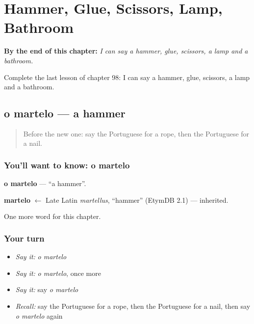 
\chapter{Hammer, Glue, Scissors, Lamp, Bathroom}
\label{ch:pt-hammer-glue-scissors-lamp-bathroom}

\begin{chapteropening}
\textbf{By the end of this chapter:} \emph{I can say a hammer, glue, scissors, a lamp and a bathroom.}

Complete the last lesson of chapter 98: I can say a hammer, glue, scissors, a lamp and a bathroom.
\end{chapteropening}

\section[o martelo]{o martelo — a hammer}

\label{lesson:PT-C98-martelo}



\begin{quote}
Before the new one: say the Portuguese for a rope, then the Portuguese for a nail.
\end{quote}

\subsection*{You'll want to know: o martelo}
\textbf{o martelo} — \textquotedblleft{}a hammer\textquotedblright{}.

\begin{cousinweb}
\textbf{martelo} $\leftarrow$ Late Latin \emph{martellus}, \textquotedblleft{}hammer\textquotedblright{} (EtymDB 2.1) — inherited.
\end{cousinweb}

\begin{grammarlens}[title={What you've built}]
One more word for this chapter.
\end{grammarlens}

\subsection*{Your turn}
\begin{itemize}
\raggedright
  \item \emph{Say it:} \emph{o martelo}
  \item \emph{Say it:} \emph{o martelo}, once more
  \item \emph{Say it:} say \emph{o martelo}
  \item \emph{Recall:} say the Portuguese for a rope, then the Portuguese for a nail, then say \emph{o martelo} again
\end{itemize}

